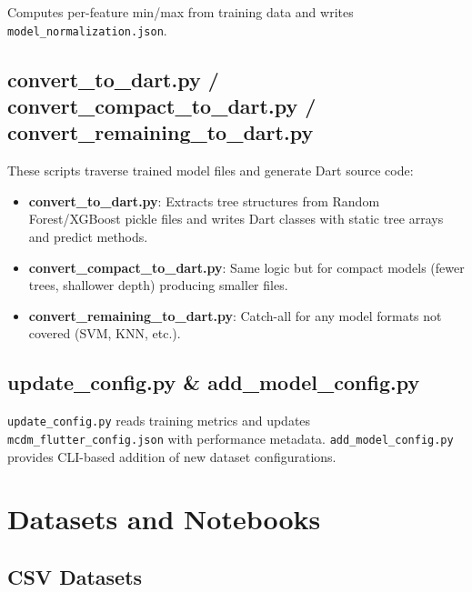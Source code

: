 \documentclass[12pt,a4paper,oneside]{report}
\begin{document}
Computes per-feature min/max from training data and writes \texttt{model\_normalization.json}.

\section{convert\_to\_dart.py / convert\_compact\_to\_dart.py / convert\_remaining\_to\_dart.py}

These scripts traverse trained model files and generate Dart source code:

\begin{itemize}
  \item \textbf{convert\_to\_dart.py}: Extracts tree structures from Random Forest/XGBoost pickle files and writes Dart classes with static tree arrays and predict methods.
  \item \textbf{convert\_compact\_to\_dart.py}: Same logic but for compact models (fewer trees, shallower depth) producing smaller files.
  \item \textbf{convert\_remaining\_to\_dart.py}: Catch-all for any model formats not covered (SVM, KNN, etc.).
\end{itemize}

\section{update\_config.py \& add\_model\_config.py}

\texttt{update\_config.py} reads training metrics and updates \texttt{mcdm\_flutter\_config.json} with performance metadata. \texttt{add\_model\_config.py} provides CLI-based addition of new dataset configurations.

\chapter{Datasets and Notebooks}
\label{ch:datasets}

\section{CSV Datasets}
\end{document}
